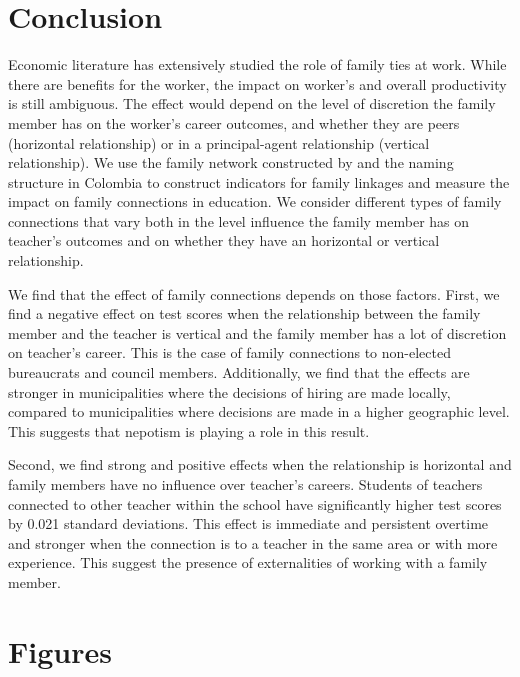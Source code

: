 \documentclass[12pt,runningheads]{article}
\begin{document}
\section{Conclusion}

Economic literature has extensively studied the role of family ties at work. While there are benefits for the worker, the impact on worker’s and overall productivity is still ambiguous. The effect would depend on the level of discretion the family member has on the worker’s career outcomes, and whether they are peers (horizontal relationship) or in a principal-agent relationship (vertical relationship).  We use the family network constructed by \cite{Riano2021} and the naming structure in Colombia to construct indicators for family linkages and measure the impact on family connections in education. We consider different types of family connections that vary both in the level influence the family member has on teacher's outcomes and on whether they have an horizontal or vertical relationship. 

We find that the effect of family connections depends on those factors. First, we find a negative effect on test scores when the relationship between the family member and the teacher is vertical and the family member has a lot of discretion on teacher's career. This is the case of family connections to non-elected bureaucrats and council members. Additionally, we find that the effects are stronger in municipalities where the decisions of hiring are made locally, compared to municipalities where decisions are made in a higher geographic level. This suggests that nepotism is playing a role in this result.

Second, we find strong and positive effects when the relationship is horizontal and family members have no influence over teacher's careers. Students of teachers connected to other teacher within the school have significantly higher test scores by 0.021 standard deviations. This effect is immediate and persistent overtime and stronger when the connection is to a teacher in the same area or with more experience. This suggest the presence of externalities of working with a family member.

\newpage




\newpage
\section*{Figures}
\end{document}
